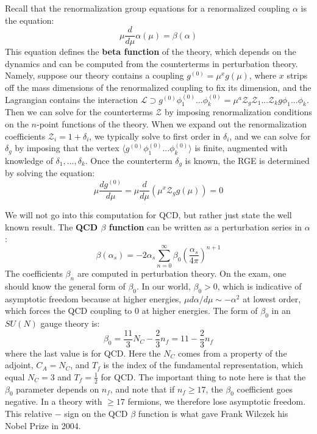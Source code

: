 \documentclass[11pt, oneside]{article}   	%
\theoremstyle{definition}
\numberwithin{equation}{subsection}		%
\begin{document}
Recall that the renormalization group equations for a renormalized coupling $\alpha$ is the equation:
\begin{equation}
	\mu\frac{d}{d\mu}\alpha(\mu) = \beta(\alpha)
\end{equation}
This equation defines the \textbf{beta function} of the theory, which depends on the dynamics and can be computed 
from the counterterms in perturbation theory.
Namely, suppose our theory contains a coupling $g^{(0)} = \mu^{x} g(\mu)$, where $x$ strips off the mass dimensions of 
the renormalized coupling to fix its dimension, and the Lagrangian contains the interaction $\mathcal{L}\supset g^{(0)} 
\phi_1^{(0)} ... \phi_k^{(0)} = \mu^a \mathcal{Z}_g \mathcal{Z}_1 ... \mathcal{Z}_k g \phi_1... \phi_k$. Then we can solve for 
the counterterms $\mathcal{Z}$ by imposing renormalization conditions on the $n$-point functions of the theory. When we 
expand out the renormalization coefficients $\mathcal{Z}_i = 1 + \delta_i$, we typically solve to first order in $\delta_i$, and 
we can solve for $\delta_g$ by imposing that the vertex $\langle g^{(0)} \phi_1^{(0)} ... \phi_k^{(0)}\rangle$ is finite, augmented 
with knowledge of $\delta_1, ...,  \delta_k$. Once the counterterm $\delta_g$ is known, the RGE is determined by solving 
the equation:
\begin{equation}
	\mu\frac{dg^{(0)}}{d\mu} = \mu\frac{d}{d\mu}\left(\mu^x \mathcal{Z}_g g(\mu)\right) = 0
\end{equation}

We will not go into this computation for QCD, but rather just state the well known result. The \textbf{QCD $\beta$ function} can be 
written as a perturbation series in $\alpha$:
\begin{equation}
	\beta(\alpha_s) = -2\alpha_s\sum_{n = 0}^\infty \beta_0 \left(\frac{\alpha_s}{4\pi}\right)^{n + 1}
\end{equation}
The coefficients $\beta_n$ are computed in perturbation theory. On the exam, one should know the general form of $\beta_0$. In our 
world, $\beta_0 > 0$, which is indicative of asymptotic freedom because at higher energies, $\mu d\alpha / d\mu\sim - \alpha^2$ at 
lowest order, which forces the QCD coupling to 0 at higher energies. The form of $\beta_0$ in an $SU(N)$ gauge theory is:
\begin{equation}
	\beta_0 = \frac{11}{3} N_C - \frac{2}{3} n_f = 11 - \frac{2}{3} n_f
\end{equation}
where the last value is for QCD. Here the $N_C$ comes from a property of the adjoint, $C_A = N_C$, and $T_f$ is the index of the 
fundamental representation, which equal $N_C = 3$ and $T_f = \frac{1}{2}$ for QCD. The important thing to note here is that the $\beta_0$ parameter depends on 
$n_f$, and note that if $n_f\geq 17$, the $\beta_0$ coefficient goes negative. In a theory with $\geq 17$ fermions, we  therefore lose 
asymptotic freedom. This relative $-$ sign on the QCD $\beta$ function is what gave Frank Wilczek his Nobel Prize in 2004. 
\end{document}
